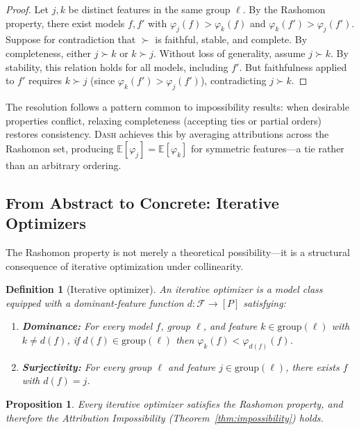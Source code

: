 \documentclass{article}
\newtheorem{definition}[theorem]{Definition}
\newtheorem{proposition}[theorem]{Proposition}
\newcommand{\E}{\mathbb{E}}
\newcommand{\DASH}{\textsc{Dash}}
\begin{document}
\begin{proof}
Let $j, k$ be distinct features in the same group $\ell$.
By the Rashomon property, there exist models $f, f'$ with $\varphi_j(f) > \varphi_k(f)$ and $\varphi_k(f') > \varphi_j(f')$.
Suppose for contradiction that $\succ$ is faithful, stable, and complete.
By completeness, either $j \succ k$ or $k \succ j$.
Without loss of generality, assume $j \succ k$.
By stability, this relation holds for all models, including $f'$.
But faithfulness applied to $f'$ requires $k \succ j$ (since $\varphi_k(f') > \varphi_j(f')$), contradicting $j \succ k$.
\end{proof}

The resolution follows a pattern common to impossibility results: when desirable properties conflict, relaxing completeness (accepting ties or partial orders) restores consistency.
\DASH{} achieves this by averaging attributions across the Rashomon set, producing $\E[\varphi_j] = \E[\varphi_k]$ for symmetric features---a tie rather than an arbitrary ordering.

\subsection{From Abstract to Concrete: Iterative Optimizers}
\label{sec:iterative}

The Rashomon property is not merely a theoretical possibility---it is a structural consequence of iterative optimization under collinearity.

\begin{definition}[Iterative optimizer]
\label{def:iterative}
An \emph{iterative optimizer} is a model class equipped with a dominant-feature function $d\colon \mathcal{F} \to [P]$ satisfying:
\begin{enumerate}
    \item \textbf{Dominance:} For every model $f$, group $\ell$, and feature $k \in \text{group}(\ell)$ with $k \neq d(f)$, if $d(f) \in \text{group}(\ell)$ then $\varphi_k(f) < \varphi_{d(f)}(f)$.
    \item \textbf{Surjectivity:} For every group $\ell$ and feature $j \in \text{group}(\ell)$, there exists $f$ with $d(f) = j$.
\end{enumerate}
\end{definition}

\begin{proposition}
\label{prop:iterative-rashomon}
Every iterative optimizer satisfies the Rashomon property, and therefore the Attribution Impossibility (Theorem~\ref{thm:impossibility}) holds.
\end{proposition}
\end{document}
